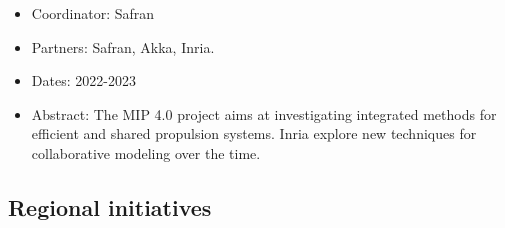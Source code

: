    \begin{itemize}
   	    \item Coordinator: Safran
      	\item Partners: Safran, Akka, Inria.
      	\item Dates: 2022-2023
      	\item Abstract: The MIP 4.0 project aims at investigating integrated methods for efficient and shared propulsion systems. Inria explore new techniques for collaborative modeling over the time. 
      \end{itemize}

 

\subsection{Regional initiatives}
